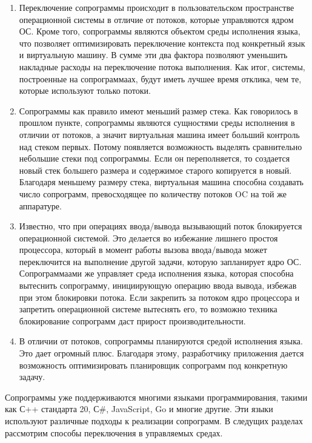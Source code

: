 	\begin{enumerate}
		\item Переключение сопрограммы происходит в пользовательском пространстве операционной системы в отличие от потоков, которые
		управляются ядром ОС. Кроме того, сопрограммы являются объектом среды исполнения языка, что позволяет оптимизировать переключение
		контекста под конкретный язык и виртуальную машину. В сумме эти два фактора позволяют уменьшить накладные расходы на переключение
		потока выполнения. Как итог, системы, построенные на сопрограммаах, будут иметь лучшее время отклика, чем те, которые используют
		только потоки.
		\item Сопрограммы как правило имеют меньший размер стека. Как говорилось в прошлом пункте,
		сопрограммы являются сущностями среды исполнения в отличии от потоков, а значит виртуальная машина имеет больший
		контроль над стеком первых. Потому появляется возможность выделять сравнительно небольшие стеки под сопрограммы. 
		Если он переполняется, то создается новый стек большего размера и содержимое старого копируется в новый. Благодаря меньшему
		размеру стека, виртуальная машина способна создавать число сопрограмм, превосходящее по количеству потоков OC на той же аппаратуре.
		\item Известно, что при операциях ввода/вывода вызывающий поток блокируется операционной системой\cite{linux-api}.
		Это делается во избежание лишнего простоя процессора, который в момент работы вызова ввода/вывода может
		переключится на выполнение другой задачи, которую запланирует ядро ОС. Сопрограммаами  же управляет среда
		исполнения языка, которая способна вытеснить сопрограмму, инициирующую операцию ввода вывода, избежав при
		этом блокировки потока. Если закрепить за потоком ядро процессора и запретить операционной системе вытеснять
		его, то возможно техника блокирование сопрограмм даст прирост производительности.
		\item В отличии от потоков, сопрограммы планируются средой исполнения языка. Это дает огромный плюс. 
		Благодаря этому, разработчику приложения дается возможность оптимизировать планировщик сопрограмм
		под конкретную задачу.
	\end{enumerate}
	
	Сопрограммы уже поддерживаются многими языками программирования, такими как С++ стандарта 20, С\#, JavaScript,
	Go и многие другие. Эти языки используют различные подходы к реализации сопрограмм. В следущих разделах 
	рассмотрим способы переключения в управляемых средах.
	

